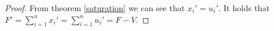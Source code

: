 \begin{proof}
    From theorem \ref{saturation} we can see that $x_i' = u_i'$. It holds that $F' = \sum\limits_{i=1}^nx_i' =
    \sum\limits_{i=1}^nu_i' = F - V$.
\end{proof}
